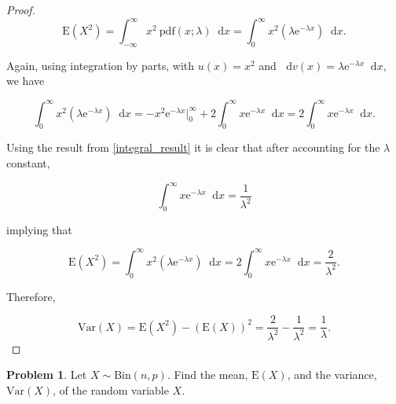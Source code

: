 \documentclass[12pt]{article}
\theoremstyle{definition}
\newtheorem{problem}{Problem}
\newcommand{\E}{\text{E}}
\newcommand{\V}{\text{Var}}
\newcommand{\pdf}{\text{pdf}}
\newcommand{\me}{\mathrm{e}}
\newcommand*\diff{\mathop{}\!\mathrm{d}}
\begin{document}
\begin{proof}
  \[
    \E(X^2) = \int_{-\infty}^{\infty} x^2\ \pdf(x; \lambda) \diff x = \int_{0}^{\infty} x^2 \left( \lambda \me^{-\lambda x} \right) \diff x.
  \]

  Again, using integration by parts, with $u(x) = x^2$ and $\diff v(x) = \lambda \me^{- \lambda x} \diff x$, we have

  \[
    \int_{0}^{\infty} x^2 \left( \lambda \me^{-\lambda x} \right) \diff x = - x^2 \me^{-\lambda x}\Big|_{0}^{\infty} + 2 \int_{0}^{\infty} x \me^{-\lambda x} \diff x = 2 \int_{0}^{\infty} x \me^{-\lambda x} \diff x.
  \]

  Using the result from \eqref{integral_result} it is clear that after accounting for the $\lambda$ constant,

  \[
    \int_{0}^{\infty} x \me^{-\lambda x} \diff x = \frac{1}{\lambda ^ 2}
  \]

  implying that

  \[
    \E(X^2) = \int_{0}^{\infty} x^2 \left( \lambda \me^{-\lambda x} \right) \diff x = 2 \int_{0}^{\infty} x \me^{-\lambda x} \diff x = \frac{2}{\lambda^2}.
  \]

  Therefore,

  \[
    \V(X) = \E(X^2) - (\E(X))^2 = \frac{2}{\lambda^2} - \frac{1}{\lambda^2} = \frac{1}{\lambda}.
  \]

\end{proof}


\begin{problem}
  Let $X \sim \text{Bin}(n, p)$. Find the mean, $\E(X)$, and the
  variance, $\V(X)$, of the random variable $X$.
\end{problem}
\end{document}
